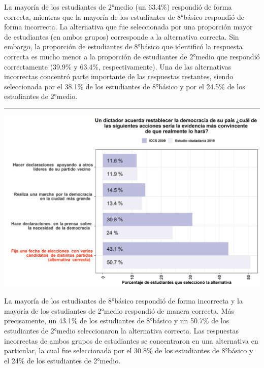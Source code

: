 \documentclass[
  14pt,
]{book}
\let\origfigure\figure
\let\endorigfigure\endfigure
\renewenvironment{figure}[1][2] {
  \expandafter\origfigure\expandafter[H]
} {
  \endorigfigure
}
\begin{document}
La mayoría de los estudiantes de 2°medio (un 63.4\%) respondió de forma correcta, mientras que la mayoría de los estudiantes de 8°básico respondió de forma incorrecta. La alternativa que fue seleccionada por una proporción mayor de estudiantes (en ambos grupos) corresponde a la alternativa correcta. Sin embargo, la proporción de estudiantes de 8°básico que identificó la respuesta correcta es mucho menor a la proporción de estudiantes de 2°medio que respondió correctamente (39.9\% y 63.4\%, respectivamente). Una de las alternativas incorrectas concentró parte importante de las respuestas restantes, siendo seleccionada por el 38.1\% de los estudiantes de 8°básico y por el 24.5\% de los estudiantes de 2°medio.

\begin{center}\rule{0.5\linewidth}{0.5pt}\end{center}

\begin{figure}[!ht]

{\centering \includegraphics[width=0.8\linewidth,]{images/graph_p5} 

}

\caption{Comparación con ICCS: Acción que demuestra que un dictador restablecerá la democracia}\label{fig:unnamed-chunk-23}
\end{figure}

La mayoría de los estudiantes de 8°básico respondió de forma incorrecta y la mayoría de los estudiantes de 2°medio respondió de manera correcta. Más precisamente, un 43.1\% de los estudiantes de 8°básico y un 50.7\% de los estudiantes de 2°medio seleccionaron la alternativa correcta. Las respuestas incorrectas de ambos grupos de estudiantes se concentraron en una alternativa en particular, la cual fue seleccionada por el 30.8\% de los estudiantes de 8°básico y el 24\% de los estudiantes de 2°medio.
\end{document}
